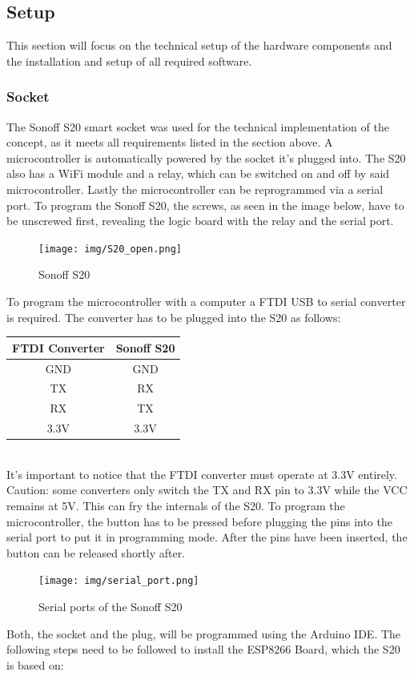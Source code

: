 \newpage
\subsection{Setup}
This section will focus on the technical setup of the hardware components and the installation and setup of all required software.
\\
\subsubsection{Socket}
The Sonoff S20 smart socket was used for the technical implementation of the concept, as it meets all requirements listed in the section above. A microcontroller is automatically powered by the socket it's plugged into. The S20 also has a WiFi module and a relay, which can be switched on and off by said microcontroller. Lastly the microcontroller can be reprogrammed via a serial port.
To program the Sonoff S20, the screws, as seen in the image below, have to be unscrewed first, revealing the logic board with the relay and the serial port.
\\
\begin{figure}[h]
    \texttt{[image: img/S20\_open.png]}
    \caption{Sonoff S20}
    \label{fig:S20}
\end{figure}
\newpage
To program the microcontroller with a computer a FTDI USB to serial converter is required. The converter has to be plugged into the S20 as follows:
\\
\begin{center}
    \begin{tabular} { |c|c| }
        \hline
        FTDI Converter & Sonoff S20 \\
        \hline\hline
        GND & GND \\
        \hline
        TX & RX \\
        \hline
        RX & TX \\
        \hline
        3.3V & 3.3V \\
        \hline
    \end{tabular}
\end{center}
\leavevmode
\\
It's important to notice that the FTDI converter must operate at 3.3V entirely. Caution: some converters only switch the TX and RX pin to 3.3V while the VCC remains at 5V. This can fry the internals of the S20. To program the microcontroller, the button has to be pressed before plugging the pins into the serial port to put it in programming mode. After the pins have been inserted, the button can be released shortly after.
\\
\begin{figure}[h]
    \texttt{[image: img/serial\_port.png]}
    \caption{Serial ports of the Sonoff S20}
    \label{fig:S20_serial}
\end{figure}
\newpage
Both, the socket and the plug, will be programmed using the Arduino IDE. The following steps need to be followed to install the ESP8266 Board, which the S20 is based on:

